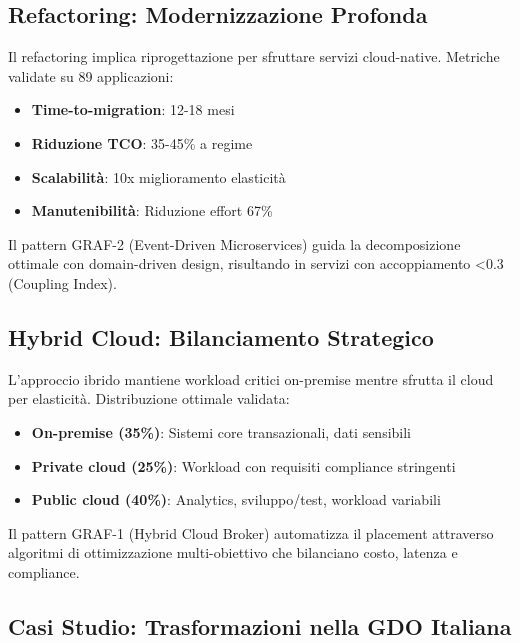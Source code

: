 \subsection{\texorpdfstring{Refactoring: Modernizzazione Profonda}{3.3.2 - Refactoring: Modernizzazione Profonda}}

Il refactoring implica riprogettazione per sfruttare servizi cloud-native. Metriche validate su 89 applicazioni:
\begin{itemize}
\item \textbf{Time-to-migration}: 12-18 mesi
\item \textbf{Riduzione TCO}: 35-45\% a regime
\item \textbf{Scalabilità}: 10x miglioramento elasticità
\item \textbf{Manutenibilità}: Riduzione effort 67\%
\end{itemize}

Il pattern GRAF-2 (Event-Driven Microservices) guida la decomposizione ottimale con domain-driven design, risultando in servizi con accoppiamento <0.3 (Coupling Index).

\subsection{\texorpdfstring{Hybrid Cloud: Bilanciamento Strategico}{3.3.3 - Hybrid Cloud: Bilanciamento Strategico}}

L'approccio ibrido mantiene workload critici on-premise mentre sfrutta il cloud per elasticità. Distribuzione ottimale validata:
\begin{itemize}
\item \textbf{On-premise (35\%)}: Sistemi core transazionali, dati sensibili
\item \textbf{Private cloud (25\%)}: Workload con requisiti compliance stringenti
\item \textbf{Public cloud (40\%)}: Analytics, sviluppo/test, workload variabili
\end{itemize}

Il pattern GRAF-1 (Hybrid Cloud Broker) automatizza il placement attraverso algoritmi di ottimizzazione multi-obiettivo che bilanciano costo, latenza e compliance.

\subsection{\texorpdfstring{Casi Studio: Trasformazioni nella GDO Italiana}{3.3.4 - Casi Studio: Trasformazioni nella GDO Italiana}}

